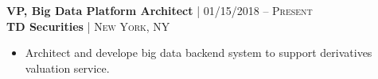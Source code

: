 {\raggedright\normalsize
\textbf{VP, Big Data Platform Architect} {\hfill\footnotesize\textsc{| 01/15/2018 -- Present}}\\ 
\textbf{TD Securities} {\hfill\footnotesize\textsc{| New York, NY}}}

\begin{itemize}[leftmargin=*, topsep=2pt, partopsep=2.5pt]
\setlength\itemsep{1pt}

\item Architect and develope big data backend system to support derivatives valuation service. 


\end{itemize}

